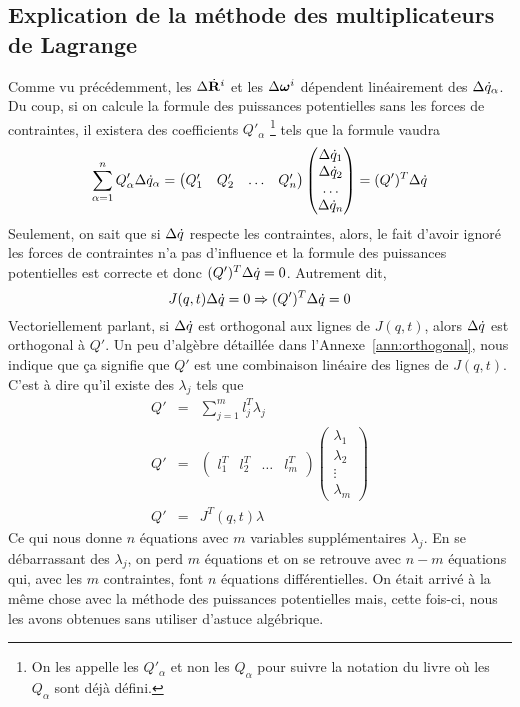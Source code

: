 \subsection{Explication de la méthode des multiplicateurs de Lagrange}
Comme vu précédemment, les $\Delta \dot{\bf R}^i$ et les $\Delta {\bm \omega}^i$ dépendent linéairement des $\Delta \dot{q}_\alpha$.
Du coup, si on calcule la formule des puissances potentielles sans les forces de contraintes, il existera des coefficients $Q'_\alpha$
\footnote{On les appelle les $Q'_\alpha$ et non les $Q_\alpha$ pour suivre la notation du livre où les $Q_\alpha$ sont déjà défini.}
tels que la formule vaudra
\[ \sum_{\alpha = 1}^n Q'_\alpha \Delta \dot{q}_\alpha =
\begin{pmatrix}Q'_1 & Q'_2 & \ldots & Q'_n\end{pmatrix}\begin{pmatrix}\Delta \dot{q}_1\\\Delta \dot{q}_2\\\ldots\\\Delta \dot{q}_n\end{pmatrix}
= (Q')^T \Delta \dot{q} \]
Seulement, on sait que si $\Delta \dot{q}$ respecte les contraintes, alors, le fait d'avoir ignoré les forces de contraintes n'a pas d'influence et la formule des puissances potentielles est correcte et donc $(Q')^T \Delta \dot{q} = 0$.
Autrement dit,
\[ J(q, t) \Delta \dot{q} = 0 \Rightarrow (Q')^T \Delta \dot{q} = 0 \]
Vectoriellement parlant, si $\Delta \dot{q}$ est orthogonal aux lignes de $J(q, t)$, alors $\Delta \dot{q}$ est orthogonal à $Q'$.
Un peu d'algèbre détaillée dans l'Annexe~\ref{ann:orthogonal}, nous indique que ça signifie que $Q'$ est une combinaison linéaire des lignes de $J(q, t)$.
C'est à dire qu'il existe des $\lambda_j$ tels que
\begin{eqnarray*}
  Q' &=& \sum_{j = 1}^m l_j^T \lambda_j\\
Q' &=& \begin{pmatrix}l_1^T&l_2^T&\ldots&l_m^T\end{pmatrix} \begin{pmatrix}\lambda_1\\\lambda_2\\\vdots\\\lambda_m\end{pmatrix}\\
  Q' &=& J^T(q, t) \lambda
\end{eqnarray*}
Ce qui nous donne $n$ équations avec $m$ variables supplémentaires $\lambda_j$.
En se débarrassant des $\lambda_j$, on perd $m$ équations et on se retrouve avec $n - m$ équations qui, avec les $m$ contraintes, font $n$ équations différentielles.
On était arrivé à la même chose avec la méthode des puissances potentielles mais, cette fois-ci, nous les avons obtenues sans utiliser d'astuce algébrique.

